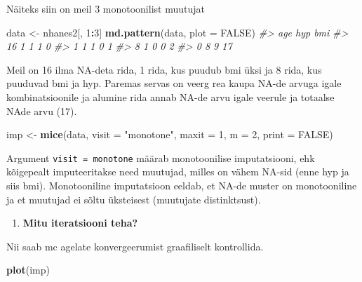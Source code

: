 \documentclass[]{book}
\newenvironment{Shaded}{\begin{snugshade}}{\end{snugshade}}
\newcommand{\KeywordTok}[1]{\textcolor[rgb]{0.13,0.29,0.53}{\textbf{#1}}}
\newcommand{\DataTypeTok}[1]{\textcolor[rgb]{0.13,0.29,0.53}{#1}}
\newcommand{\DecValTok}[1]{\textcolor[rgb]{0.00,0.00,0.81}{#1}}
\newcommand{\StringTok}[1]{\textcolor[rgb]{0.31,0.60,0.02}{#1}}
\newcommand{\CommentTok}[1]{\textcolor[rgb]{0.56,0.35,0.01}{\textit{#1}}}
\newcommand{\OtherTok}[1]{\textcolor[rgb]{0.56,0.35,0.01}{#1}}
\newcommand{\OperatorTok}[1]{\textcolor[rgb]{0.81,0.36,0.00}{\textbf{#1}}}
\newcommand{\NormalTok}[1]{#1}
\providecommand{\tightlist}{%
  \setlength{\itemsep}{0pt}\setlength{\parskip}{0pt}}
\begin{document}
Näiteks siin on meil 3 monotoonilist muutujat

\begin{Shaded}
\begin{Highlighting}[]
\NormalTok{data <-}\StringTok{ }\NormalTok{nhanes2[, }\DecValTok{1}\OperatorTok{:}\DecValTok{3}\NormalTok{]}
\KeywordTok{md.pattern}\NormalTok{(data, }\DataTypeTok{plot =} \OtherTok{FALSE}\NormalTok{)}
\CommentTok{#>    age hyp bmi   }
\CommentTok{#> 16   1   1   1  0}
\CommentTok{#> 1    1   1   0  1}
\CommentTok{#> 8    1   0   0  2}
\CommentTok{#>      0   8   9 17}
\end{Highlighting}
\end{Shaded}

Meil on 16 ilma NA-deta rida, 1 rida, kus puudub bmi üksi ja 8 rida, kus
puuduvad bmi ja hyp. Paremas servas on veerg rea kaupa NA-de arvuga
igale kombinatsioonile ja alumine rida annab NA-de arvu igale veerule ja
totaalse NAde arvu (17).

\begin{Shaded}
\begin{Highlighting}[]
\NormalTok{imp <-}\StringTok{ }\KeywordTok{mice}\NormalTok{(data, }\DataTypeTok{visit =} \StringTok{"monotone"}\NormalTok{, }\DataTypeTok{maxit =} \DecValTok{1}\NormalTok{, }\DataTypeTok{m =} \DecValTok{2}\NormalTok{,}
            \DataTypeTok{print =} \OtherTok{FALSE}\NormalTok{)}
\end{Highlighting}
\end{Shaded}

Argument \texttt{visit\ =\ monotone} määrab monotoonilise imputatsiooni,
ehk kõigepealt imputeeritakse need muutujad, milles on vähem NA-sid
(enne hyp ja siis bmi). Monotooniline imputatsioon eeldab, et NA-de
muster on monotooniline ja et muutujad ei sõltu üksteisest (muutujate
distinktsust).

\begin{enumerate}
\def\labelenumi{\arabic{enumi}.}
\setcounter{enumi}{5}
\tightlist
\item
  \textbf{Mitu iteratsiooni teha?}
\end{enumerate}

Nii saab mc agelate konvergeerumist graafiliselt kontrollida.

\begin{Shaded}
\begin{Highlighting}[]
\KeywordTok{plot}\NormalTok{(imp)}
\end{Highlighting}
\end{Shaded}
\end{document}
